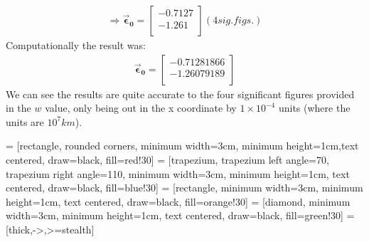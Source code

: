 \documentclass[a4paper]{article}
\begin{document}
		\begin{align}
			\Rightarrow\bm{\vec{\epsilon}_0}=
			\begin{bmatrix}
				-0.7127 \\
				-1.261 \\
			\end{bmatrix}(4 sig. figs.)
		\end{align}
		Computationally the result was:
		\begin{align}
			\bm{\vec{\epsilon}_0}=
			\begin{bmatrix}
				-0.71281866 \\
				-1.26079189 \\
			\end{bmatrix}
		\end{align}
		We can see the results are quite accurate to the four significant figures provided in the $w$ value, only being out in the x coordinate by $1\times 10^{-4}$ units (where the units are $10^7km$).

	\clearpage
	 = [rectangle, rounded corners, minimum width=3cm, minimum height=1cm,text centered, draw=black, fill=red!30]
	 = [trapezium, trapezium left angle=70, trapezium right angle=110, minimum width=3cm, minimum height=1cm, text centered, draw=black, fill=blue!30]
	 = [rectangle, minimum width=3cm, minimum height=1cm, text centered, draw=black, fill=orange!30]
	 = [diamond, minimum width=3cm, minimum height=1cm, text centered, draw=black, fill=green!30]
	 = [thick,->,>=stealth]
	
\end{document}

